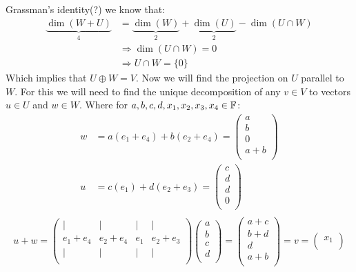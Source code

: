 \documentclass[11pt, a4paper]{article}
\begin{document}
\begin{solution}
\begin{enumerate}
  Grassman's identity(?) we know that:
  \begin{align*}
    \underbrace{\dim(W+U)}_4 &= \underbrace{\dim(W)}_2
    + \underbrace{\dim(U)}_2 - \dim(U\cap W) \\
    &\Rightarrow \dim(U\cap W) = 0 \\
    &\Rightarrow U\cap W = \{0\}
  \end{align*}
  Which implies that $U\oplus W = V$. Now we will find the projection on 
  $U$ parallel to $W$. For this we will need to find the unique decomposition
  of any $v\in V$ to vectors $u\in U$ and $w\in W$. Where for 
  $a,b,c,d,x_1,x_2,x_3,x_4\in\mathbb{F}$:
  \begin{align*}
    w &= a(e_1+e_4) + b(e_2+e_4) = 
    \begin{pmatrix}
  a\\
  b\\
  0\\
  a+b\\
    \end{pmatrix} \\
    u &= c(e_1) + d(e_2+e_3) = 
    \begin{pmatrix}
  c\\
  d\\
  d\\
  0\\
    \end{pmatrix} \\
  \end{align*}
  \[
    u+w = 
    \begin{pmatrix}
  \vert & \vert & \vert & \vert\\
  e_1+e_4 & e_2+e_4 & e_1 & e_2+e_3\\
  \vert & \vert & \vert & \vert\\
    \end{pmatrix}
    \begin{pmatrix}
  a\\
  b\\
  c\\
  d\\
    \end{pmatrix} =
    \begin{pmatrix}
  a+c\\
  b+d\\
  d\\
  a+b\\
    \end{pmatrix}
    = v =
    \begin{pmatrix}
  x_1\\

\end{pmatrix}\]
\end{enumerate}
\end{solution}
\end{document}
